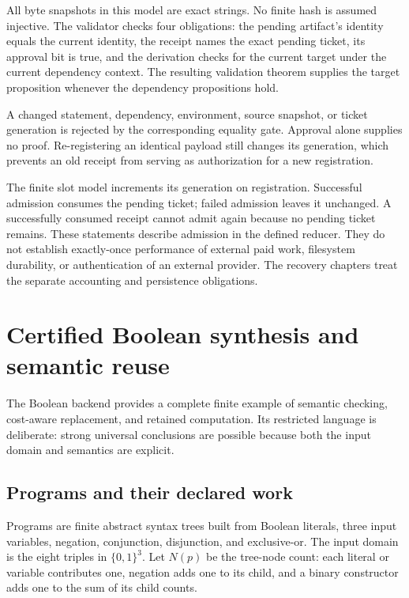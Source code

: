 All byte snapshots in this model are exact strings. No finite hash is assumed injective. The validator checks four obligations: the pending artifact's identity equals the current identity, the receipt names the exact pending ticket, its approval bit is true, and the derivation checks for the current target under the current dependency context. The resulting validation theorem supplies the target proposition whenever the dependency propositions hold.

A changed statement, dependency, environment, source snapshot, or ticket generation is rejected by the corresponding equality gate. Approval alone supplies no proof. Re-registering an identical payload still changes its generation, which prevents an old receipt from serving as authorization for a new registration.

The finite slot model increments its generation on registration. Successful admission consumes the pending ticket; failed admission leaves it unchanged. A successfully consumed receipt cannot admit again because no pending ticket remains. These statements describe admission in the defined reducer. They do not establish exactly-once performance of external paid work, filesystem durability, or authentication of an external provider. The recovery chapters treat the separate accounting and persistence obligations.

\section{Certified Boolean synthesis and semantic reuse}
\label{sec:boolean-synthesis}

The Boolean backend provides a complete finite example of semantic checking, cost-aware replacement, and retained computation. Its restricted language is deliberate: strong universal conclusions are possible because both the input domain and semantics are explicit.

\subsection{Programs and their declared work}

Programs are finite abstract syntax trees built from Boolean literals, three input variables, negation, conjunction, disjunction, and exclusive-or. The input domain is the eight triples in $\{0,1\}^3$. Let $N(p)$ be the tree-node count: each literal or variable contributes one, negation adds one to its child, and a binary constructor adds one to the sum of its child counts.

